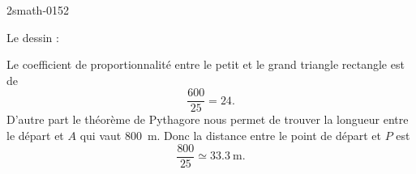 
\begin{corrige}{2smath-0152}

    Le dessin :
\begin{center}
   
\end{center}
Le coefficient de proportionnalité entre le petit et le grand triangle rectangle est de 
\begin{equation}
    \frac{ 600 }{ 25 }=24.
\end{equation}
D'autre part le théorème de Pythagore nous permet de trouver la longueur entre le départ et \( A\) qui vaut \SI{800}{\meter}. Donc la distance entre le point de départ et \( P\) est
\begin{equation}
    \frac{ 800 }{ 25 }\simeq \SI{33.3}{\meter}.
\end{equation}

\end{corrige}
